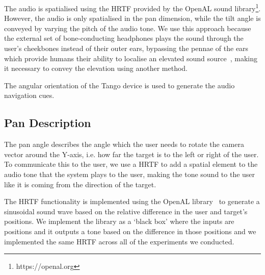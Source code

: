 \documentclass[format=sigconf, review=true, screen=true, anonymous=true]{acmart}
\begin{document}
The audio is spatialised using the HRTF provided by the OpenAL sound library\footnote{https://openal.org}. However, the audio is only spatialised in the pan dimension, while the tilt angle is conveyed by varying the pitch of the audio tone. We use this approach because the external set of bone-conducting headphones plays the sound through the user's cheekbones instead of their outer ears, bypassing the pennae of the ears which provide humans their ability to localise an elevated sound source~\cite{roffler1968factors, algazi2001elevation}, making it necessary to convey the elevation using another method. 

The angular orientation of the Tango device is used to generate the audio navigation cues. %

\subsection{Pan Description}

The pan angle describes the angle which the user needs to rotate the camera vector around the Y-axis, i.e. how far the target is to the left or right of the user. To communicate this to the user, we use a HRTF to add a spatial element to the audio tone that the system plays to the user, making the tone sound to the user like it is coming from the direction of the target. 

The HRTF functionality is implemented using the OpenAL library~\cite{hiebert2005openal} to generate a sinusoidal sound wave based on the relative difference in the user and target's positions. We implement the library as a `black box' where the inputs are positions and it outputs a tone based on the difference in those positions and we implemented the same HRTF across all of the experiments we conducted.  

\end{document}
